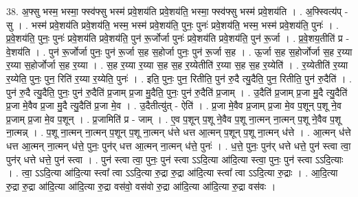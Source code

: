 \documentclass[17pt]{extarticle}
\begin{document}
38. अ॒फ्सु भस्म॒ भस्मा॒ फ्स्व॑फ्सु भस्म॑ प्रवे॒शय॑ति प्रवे॒शय॑ति॒ भस्मा॒ फ्स्व॑फ्सु भस्म॑ प्रवे॒शय॑ति । . अ॒फ्स्वित्य॑प् - सु । . भस्म॑ प्रवे॒शय॑ति प्रवे॒शय॑ति॒ भस्म॒ भस्म॑ प्रवे॒शय॑ति॒ पुनः॒ पुनः॑ प्रवे॒शय॑ति॒ भस्म॒ भस्म॑ प्रवे॒शय॑ति॒ पुनः॑ । . प्र॒वे॒शय॑ति॒ पुनः॒ पुनः॑ प्रवे॒शय॑ति प्रवे॒शय॑ति॒ पुन॑ रू॒र्जोर्जा पुनः॑ प्रवे॒शय॑ति प्रवे॒शय॑ति॒ पुन॑ रू॒र्जा । . प्र॒वे॒शय॒तीति॑ प्र - वे॒शय॑ति । . पुन॑ रू॒र्जोर्जा पुनः॒ पुन॑ रू॒र्जा स॒ह स॒होर्जा पुनः॒ पुन॑ रू॒र्जा स॒ह । . ऊ॒र्जा स॒ह स॒होर्जोर्जा स॒ह र॒य्या र॒य्या स॒होर्जोर्जा स॒ह र॒य्या । . स॒ह र॒य्या र॒य्या स॒ह स॒ह र॒य्येतीति॑ र॒य्या स॒ह स॒ह र॒य्येति॑ । . र॒य्येतीति॑ र॒य्या र॒य्येति॒ पुनः॒ पुन॒ रिति॑ र॒य्या र॒य्येति॒ पुनः॑ । . इति॒ पुनः॒ पुन॒ रितीति॒ पुन॑ रु॒दै त्यु॒दैति॒ पुन॒ रितीति॒ पुन॑ रु॒दैति॑ । . पुन॑ रु॒दै त्यु॒दैति॒ पुनः॒ पुन॑ रु॒दैति॑ प्र॒जाम् प्र॒जा मु॒दैति॒ पुनः॒ पुन॑ रु॒दैति॑ प्र॒जाम् । . उ॒दैति॑ प्र॒जाम् प्र॒जा मु॒दै त्यु॒दैति॑ प्र॒जा मे॒वैव प्र॒जा मु॒दै त्यु॒दैति॑ प्र॒जा मे॒व । . उ॒दैतीत्यु॑त् - ऐति॑ । . प्र॒जा मे॒वैव प्र॒जाम् प्र॒जा मे॒व प॒शून् प॒शू ने॒व प्र॒जाम् प्र॒जा मे॒व प॒शून् । . प्र॒जामिति॑ प्र - जाम् । . ए॒व प॒शून् प॒शू ने॒वैव प॒शू ना॒त्मन् ना॒त्मन् प॒शू ने॒वैव प॒शू ना॒त्मन्न् । . प॒शू ना॒त्मन् ना॒त्मन् प॒शून् प॒शू ना॒त्मन् ध॑त्ते धत्त आ॒त्मन् प॒शून् प॒शू ना॒त्मन् ध॑त्ते । . आ॒त्मन् ध॑त्ते धत्त आ॒त्मन् ना॒त्मन् ध॑त्ते॒ पुनः॒ पुन॑र् धत्त आ॒त्मन् ना॒त्मन् ध॑त्ते॒ पुनः॑ । . ध॒त्ते॒ पुनः॒ पुन॑र् धत्ते धत्ते॒ पुन॑ स्त्वा त्वा॒ पुन॑र् धत्ते धत्ते॒ पुन॑ स्त्वा । . पुन॑ स्त्वा त्वा॒ पुनः॒ पुन॑ स्त्वा ऽऽदि॒त्या आ॑दि॒त्या स्त्वा॒ पुनः॒ पुन॑ स्त्वा ऽऽदि॒त्याः । . त्वा॒ ऽऽदि॒त्या आ॑दि॒त्या स्त्वा᳚ त्वा ऽऽदि॒त्या रु॒द्रा रु॒द्रा आ॑दि॒त्या स्त्वा᳚ त्वा ऽऽदि॒त्या रु॒द्राः । . आ॒दि॒त्या रु॒द्रा रु॒द्रा आ॑दि॒त्या आ॑दि॒त्या रु॒द्रा वस॑वो॒ वस॑वो रु॒द्रा आ॑दि॒त्या आ॑दि॒त्या रु॒द्रा वस॑वः । \newline
\pagebreak
{}
\end{document}
